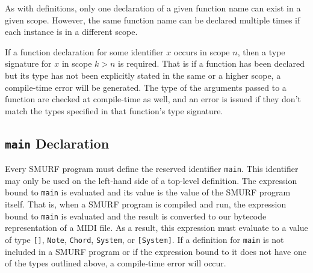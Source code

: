 As with definitions, only one declaration of a given function name can exist
in a given scope. However, the same function name can be declared multiple
times if each instance is in a different scope.

If a function declaration for some identifier $x$ occurs in scope $n$, then
a type signature for $x$ in scope $k>n$ is required. That is if a function has
been declared but its type has not been explicitly stated in the same or a higher
scope, a compile-time error will be generated. The type of the arguments
passed to a function are checked at compile-time as well, and an error
is issued if they don't match the types specified in that function's 
type signature.

\subsection{\texttt{main} Declaration}

Every SMURF program must define the reserved identifier \texttt{main}. This
identifier may only be used on the left-hand side of a top-level definition. The expression
bound to \texttt{main} is evaluated and its value is the value of the SMURF program itself.
That is, when a SMURF program is compiled and run, the expression bound to \texttt{main} is
evaluated and the result is converted to our bytecode representation of a MIDI file. As a result,
this expression must evaluate to a value of type \texttt{[]}, \texttt{Note}, \texttt{Chord}, 
\texttt{System}, or \texttt{[System]}. If a definition for \texttt{main} is not included in a 
SMURF program or if the expression bound to it does not have one of the types outlined above,
a compile-time error will occur.

